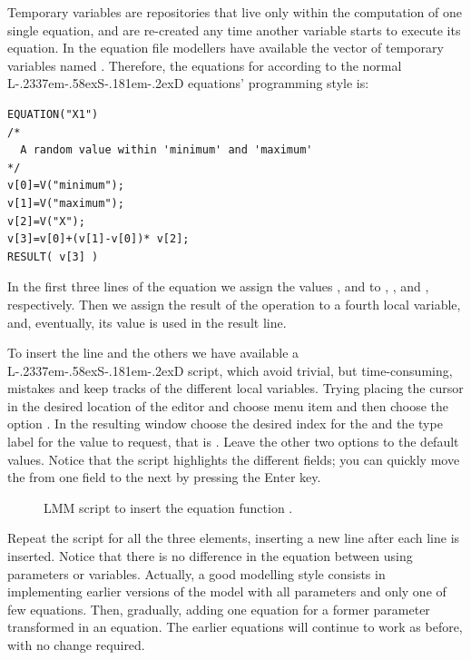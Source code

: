 \documentclass [11pt,a4paper] {book}
\def\LsD{{L\kern-.2337em\lower-.58ex\hbox{S}\kern-.181em\lower-.2ex\hbox{D}}\xspace}
\begin{document}
Temporary variables are repositories that live
only within the computation of one single equation, and are re-created any time another variable starts to execute its equation. In the equation file modellers have
available the vector of temporary variables named .
Therefore, the equations for  according to the normal \LsD equations' programming
style is:

\small
\begin{verbatim}
EQUATION("X1")
/*
  A random value within 'minimum' and 'maximum'
*/
v[0]=V("minimum");
v[1]=V("maximum");
v[2]=V("X");
v[3]=v[0]+(v[1]-v[0])* v[2];
RESULT( v[3] )
\end{verbatim}
\normalsize

In the first three lines of the equation we assign the values ,
 and  to , , and , respectively. Then we assign the result of the operation to a fourth local variable,  and, eventually, its value is used in the result line.


To insert the  line and the others we have available a
\LsD script, which avoid trivial, but time-consuming, mistakes and keep tracks of the different local variables. Trying placing the cursor in the desired location of the editor and choose
menu item \menu{Edit/Insert \LsD Script} and then choose the option . In
the resulting window choose the desired index for the  and the type label
for the value to request, that is . Leave the other two options to the default values. Notice that the script highlights the different fields; you can quickly move the from one field to the next by pressing the Enter key. 

\begin{figure}[ht]
  \centering
  \caption{LMM script to insert the equation function . }
  \label{fig:scriptv}
\end{figure}

Repeat the script for all the three elements, inserting a new line after each line is inserted.
Notice that there is no difference in the equation between using parameters or variables.
Actually, a good modelling style consists in implementing earlier versions of the model
with all parameters and only one of few equations. Then, gradually, adding one equation
for a former parameter transformed in an equation. The earlier equations will continue to
work as before, with no change required.
\end{document}
